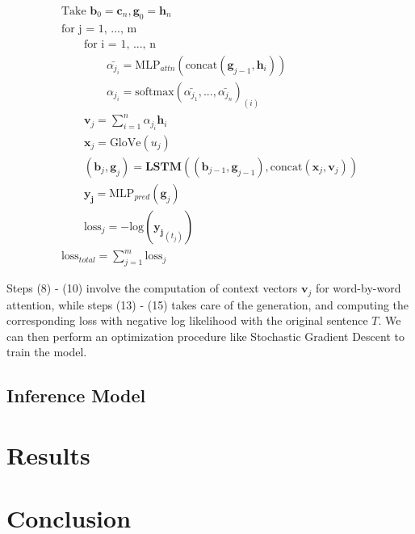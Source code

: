 \documentclass[a4paper, 12pt]{article}
\theoremstyle{definition}
\begin{document}
\begin{gather}
\text{Take } \mathbf{b}_0 = \mathbf{c}_n, \mathbf{g}_0 = \mathbf{h}_n \\
\text{for j = 1, ..., m} \\
	\qquad\text{for i = 1, ..., n} \\
		\qquad\qquad \bar{\alpha_{j_{i}}} = \text{MLP}_{attn}(\text{concat}(\mathbf{g}_{j-1},\mathbf{h}_i))\\
		\qquad\qquad \alpha_{j_{i}} = \text{softmax}(\bar{\alpha_{j_{1}}}, ..., \bar{\alpha_{j_{n}}})_{(i)} \\
	\qquad \mathbf{v}_j = \sum_{i = 1}^{n}\alpha_{j_{i}}\mathbf{h}_i \\
	\qquad \mathbf{x}_j = \text{GloVe}(u_j)  \\
	\qquad (\mathbf{b}_{j}, \mathbf{g}_{j}) = \textbf{LSTM}((\mathbf{b}_{j-1}, \mathbf{g}_{j-1}), \text{concat}(\mathbf{x}_{j}, \mathbf{v}_j)) \\
	\qquad\mathbf{y_j} = \text{MLP}_{pred}(\mathbf{g}_j) \\
	\qquad\text{loss}_j = -\text{log}(\mathbf{y_j}_{(t_j)}) \\
\text{loss}_{total} = \sum_{j=1}^{m}\text{loss}_j
\end{gather}

Steps (8) - (10) involve the computation of context vectors $\mathbf{v}_j$ for word-by-word attention, while steps (13) - (15) takes care of the generation, and computing the corresponding loss with negative log likelihood with the original sentence $T$.  We can then perform an optimization procedure like Stochastic Gradient Descent to train the model.

\subsection{Inference Model}

\section{Results}

\section{Conclusion}

\bigskip


\end{document}
